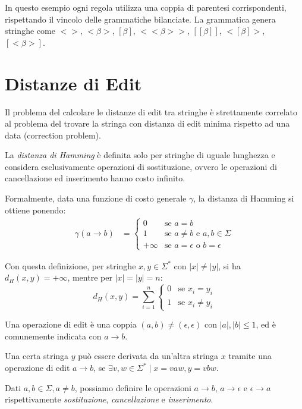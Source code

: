 \documentclass[a4paper,12pt]{report}
\theoremstyle{propositionstyle}
\begin{document}
    In questo esempio ogni regola utilizza una coppia di parentesi corrispondenti, rispettando il vincolo delle grammatiche bilanciate. La grammatica genera stringhe come $<>$, $<\beta>$, $[\beta]$, $<<\beta>>$, $[[\beta]]$, $<[\beta]>$, $[<\beta>]$.

    \section{Distanze di Edit}

    Il problema del calcolare le distanze di edit tra stringhe è strettamente correlato al problema del trovare la stringa con distanza di edit minima rispetto ad una data (correction problem).
    
    La \textit{distanza di Hamming} è definita solo per stringhe di uguale lunghezza e considera esclusivamente operazioni di sostituzione, ovvero le operazioni di cancellazione ed inserimento hanno costo infinito.
    
    Formalmente, data una funzione di costo generale $\gamma$, la distanza di Hamming si ottiene ponendo:
    \begin{align}
        \gamma(a \rightarrow b) &= \begin{cases}
            0 & \text{se } a = b \\
            1 & \text{se } a \neq b \text{ e } a, b \in \Sigma \\
            +\infty & \text{se } a = \epsilon \text{ o } b = \epsilon
        \end{cases}
    \end{align}
    
    Con questa definizione, per stringhe $x, y \in \Sigma^*$ con $|x| \neq |y|$, si ha $d_H(x, y) = +\infty$, mentre per $|x| = |y| = n$:
    \[
        d_H(x, y) = \sum_{i=1}^{n} \begin{cases}
            0 & \text{se } x_i = y_i \\
            1 & \text{se } x_i \neq y_i
        \end{cases}
    \]
    
    Una operazione di edit è una coppia $(a, b) \neq (\epsilon, \epsilon)$ con $|a|, |b| \leq 1$, ed è comunemente indicata con $a \rightarrow b$.

    Una certa stringa $y$ può essere derivata da un'altra stringa $x$ tramite una operazione di edit $a \rightarrow b$, se $\exists v, w \in \Sigma^* \mid x = vaw, y = vbw$.
    
    Dati $a, b \in \Sigma, a \neq b$, possiamo definire le operazioni $a \rightarrow b$, $a \rightarrow \epsilon$ e $\epsilon \rightarrow a$ rispettivamente
    \textit{sostituzione}, \textit{cancellazione} e \textit{inserimento}.
    
\end{document}
